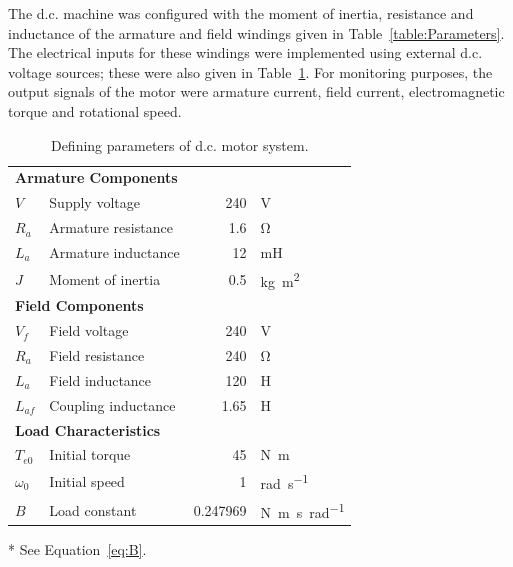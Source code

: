 \documentclass[a4paper,11pt,twocolumn]{article}
\newcommand{\V}{\si{\volt}\xspace}
\newcommand{\Ohm}{\si{\ohm}\xspace}
\renewcommand{\H}{\si{\henry}\xspace}
\newcommand{\mH}{\si{\milli\henry}\xspace}
\newcommand{\Nm}{\si{\newton\metre}\xspace}
\newcommand{\rps}{\si{\radian\per\second}\xspace}
\newcommand{\kgmm}{\si{\kilogram\square\metre}\xspace}
\newcommand{\Nmspr}{\si{\newton\metre\second\per\radian}\xspace}
\newcommand{\DC}{d.c.\xspace}
\begin{document}
The \DC machine was configured with the moment of inertia, resistance and 
inductance of the armature and field windings given in 
Table~\vref{table:Parameters}. The electrical inputs for these windings were 
implemented using external \DC voltage sources; these were also given in 
Table~\ref{table:Parameters}. For monitoring purposes, the output signals of 
the motor were armature current, field current, electromagnetic torque and 
rotational speed.
\begin{table}[h]
    \centering
    \small
    \begin{threeparttable}
        \caption{Defining parameters of \DC motor system.\vspace{-1em}}
        \label{table:Parameters}
        \begin{tabular}{@{}llrl@{}}
            \toprule
            \multicolumn{4}{l}{\textbf{Armature Components}} \\
            \hspace{1em}$V$   & Supply voltage      & 240 & \V \\
            \hspace{1em}$R_a$ & Armature resistance & 1.6 & \Ohm \\
            \hspace{1em}$L_a$ & Armature inductance &  12 & \mH \\
            \hspace{1em}$J$   & Moment of inertia   & 0.5 & \kgmm \\
            \midrule
            \multicolumn{4}{l}{\textbf{Field Components}} \\
            \hspace{1em}$V_f$    & Field voltage       &  240 & \V \\
            \hspace{1em}$R_a$    & Field resistance    &  240 & \Ohm \\
            \hspace{1em}$L_a$    & Field inductance    &  120 & \H \\
            \hspace{1em}$L_{af}$ & Coupling inductance & 1.65 & \H \\
            \midrule
            \multicolumn{4}{l}{\textbf{Load Characteristics}} \\
            \hspace{1em}$T_{e0}$   & Initial torque         & 45       & \Nm \\
            \hspace{1em}$\omega_0$ & Initial speed          &  1       & \rps \\
            \hspace{1em}$B$        & Load constant\tnote{*} & 0.247969 & \Nmspr 
            \\
            \bottomrule
        \end{tabular}
        \begin{tablenotes}
            \item[*]See Equation~\vref{eq:B}.
        \end{tablenotes}
    \end{threeparttable}
\end{table}
\end{document}
